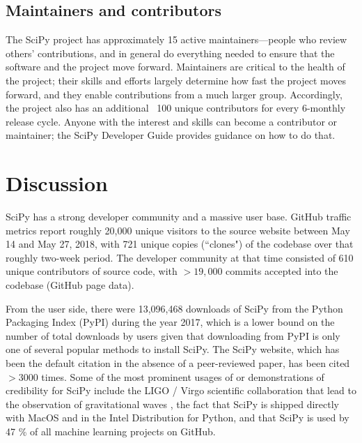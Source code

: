 \documentclass[fleqn,10pt]{wlscirep}
\begin{document}
\subsection*{Maintainers and contributors}

The SciPy project has approximately 15 active maintainers---people who review
others' contributions, and in general do everything needed to ensure that the
software and the project move forward. Maintainers are critical to the health
of the project\cite{eghbal2016}; their skills and efforts largely determine how
fast the project moves forward, and they enable contributions from a much
larger group. Accordingly, the project also has an additional ~100 unique
contributors for every 6-monthly release cycle. Anyone with the interest and
skills can become a contributor or maintainer; the SciPy Developer
Guide\cite{scipy-dev-guide} provides guidance on how to do that.

\section*{Discussion}


SciPy has a strong developer community and a massive user base. GitHub traffic
metrics report roughly 20,000 unique visitors to the source website between May
14 and May 27, 2018, with 721 unique copies (``clones") of the codebase over
that roughly two-week period. The developer community at that time consisted of 610 unique
contributors of source code, with $>19,000$ commits accepted into the codebase
(GitHub page data).

From the user side, there were 13,096,468 downloads of SciPy from the Python
Packaging Index (PyPI) during the year 2017\cite{pypinfo}, which is a lower
bound on the number of total downloads by users given that downloading from
PyPI is only one of several popular methods to install SciPy.  The SciPy
website\cite{SciPylib}, which has been the default citation in the absence of a
peer-reviewed paper, has been cited $>3000$ times. Some of the most prominent
usages of or demonstrations of credibility for SciPy include the LIGO / Virgo
scientific collaboration that lead to the observation of gravitational waves
\cite{PhysRevLett.116.061102}, the fact that SciPy is shipped directly with
MacOS and in the Intel Distribution for Python\cite{intel-python}, and that SciPy is used
by 47 \% of all machine learning projects on GitHub\cite{octoverse-scipy}.
\end{document}
